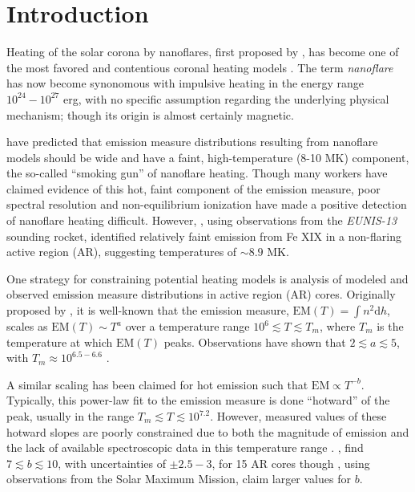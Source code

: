 \documentclass[apj]{emulateapj}
\begin{document}
	\section{Introduction}
	\label{sec:intro}
	\par Heating of the solar corona by nanoflares, first proposed by \citet{parker_nanoflares_1988}, has become one of the most favored and contentious coronal heating models  \citep{cargill_implications_1994,cargill_nanoflare_2004,klimchuk_solving_2006}. The term \textit{nanoflare} has now become synonomous with impulsive heating in the energy range $10^{24}-10^{27}$ erg, with no specific assumption regarding the underlying physical mechanism; though its origin is almost certainly magnetic.
	\par \citet{cargill_implications_1994,cargill_nanoflare_2004} have predicted that emission measure distributions resulting from nanoflare models should be wide and have a faint, high-temperature (8-10 MK) component, the so-called ``smoking gun'' of nanoflare heating. Though many workers \citep{reale_evidence_2009,schmelz_hinode_2009,miceli_x-ray_2012,testa_hinode/eis_2012,del_zanna_elemental_2014,petralia_thermal_2014,schmelz_hot_2015} have claimed evidence of this hot, faint component of the emission measure, poor spectral resolution \citep{testa_temperature_2011,winebarger_defining_2012} and non-equilibrium ionization \citep{bradshaw_explosive_2006,reale_nonequilibrium_2008} have made a positive detection of nanoflare heating difficult. However, \citet{brosius_pervasive_2014}, using observations from the \textit{EUNIS-13} sounding rocket, identified relatively faint emission from Fe XIX in a non-flaring active region (AR), suggesting temperatures of $\sim8.9$ MK.
	\par One strategy for constraining potential heating models is analysis of modeled and observed emission measure distributions in active region (AR) cores. Originally proposed by \citet{jordan_structure_1975}, it is well-known that the emission measure, $\mathrm{EM}(T)=\int n^2\mathrm{d}h$, scales as $\mathrm{EM}(T)\sim T^a$ over a temperature range $10^6\lesssim T\lesssim T_m$, where $T_m$ is the temperature at which $\mathrm{EM}(T)$ peaks. Observations have shown that $2\lesssim a\lesssim5$, with $T_m\approx10^{6.5-6.6}$ \citep{warren_constraints_2011,warren_systematic_2012,winebarger_using_2011,tripathi_emission_2011,schmelz_cold_2012,del_zanna_evolution_2015}. 
	\par A similar scaling has been claimed for hot emission such that $\mathrm{EM}\propto T^{-b}$. Typically, this power-law fit to the emission measure is done ``hotward'' of the peak, usually in the range $T_m\lesssim T\lesssim10^{7.2}$. However, measured values of these hotward slopes are poorly constrained due to both the magnitude of emission and the lack of available spectroscopic data in this temperature range \citep{winebarger_defining_2012}. \citet{warren_systematic_2012}, find $7\lesssim b\lesssim10$, with uncertainties of $\pm2.5-3$, for 15 AR cores though \citet{del_zanna_elemental_2014}, using observations from the Solar Maximum Mission, claim larger values for $b$.
\end{document}
